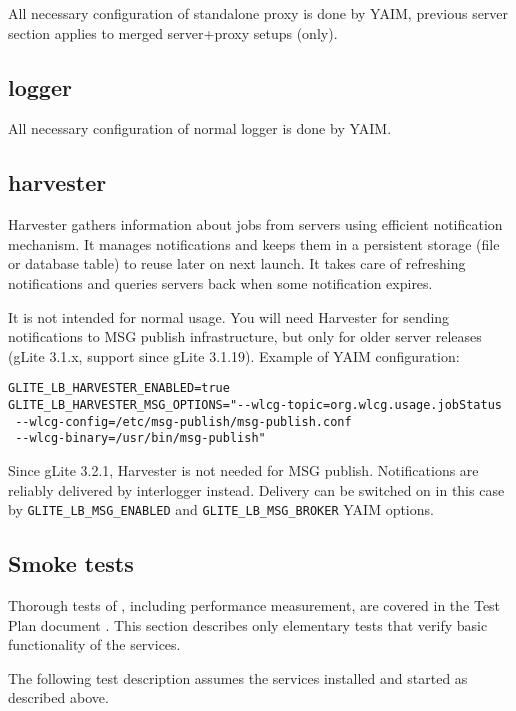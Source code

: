 All necessary configuration of standalone \LB proxy is done by YAIM,
previous \LB server section applies to merged server+proxy setups (\LBnew only).

\subsection{\LB logger}

All necessary configuration of normal \LB logger is done by YAIM.

\subsection{\LB harvester}

\LB Harvester gathers information about jobs from \LB servers using efficient
\LB notification mechanism. It manages notifications and keeps them in
a persistent storage (file or database table) to reuse later on next launch.
It takes care of refreshing notifications and queries \LB servers back when
some notification expires.

It is not intended for normal usage. You will need Harvester for sending notifications to MSG publish infrastructure, but only for older \LB server releases (gLite 3.1.x, support since gLite 3.1.19). Example of YAIM configuration:

\begin{verbatim}
GLITE_LB_HARVESTER_ENABLED=true
GLITE_LB_HARVESTER_MSG_OPTIONS="--wlcg-topic=org.wlcg.usage.jobStatus 
 --wlcg-config=/etc/msg-publish/msg-publish.conf 
 --wlcg-binary=/usr/bin/msg-publish"
\end{verbatim}

Since gLite 3.2.1, \LB Harvester is not needed for MSG publish. Notifications are reliably delivered by interlogger instead. Delivery can be switched on in this case by \texttt{GLITE\_LB\_MSG\_ENABLED} and \texttt{GLITE\_LB\_MSG\_BROKER} YAIM options.

\subsection{Smoke tests}

Thorough tests of \LB, including performance measurement, are
covered in the \LB Test Plan document \cite{lbtp}.
This section describes only elementary tests that verify basic
functionality of the services.

The following test description assumes the \LB services installed
and started as described above.

